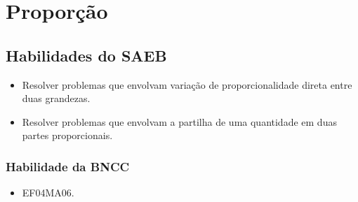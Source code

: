 \chapter{Proporção}

\section*{Habilidades do SAEB}

\begin{itemize}
\item Resolver problemas que envolvam variação de proporcionalidade direta
entre duas grandezas.

\item Resolver problemas que envolvam a partilha de uma quantidade em duas
partes proporcionais.
\end{itemize}

\subsection{Habilidade da BNCC}

\begin{itemize}
\item EF04MA06.
\end{itemize}


